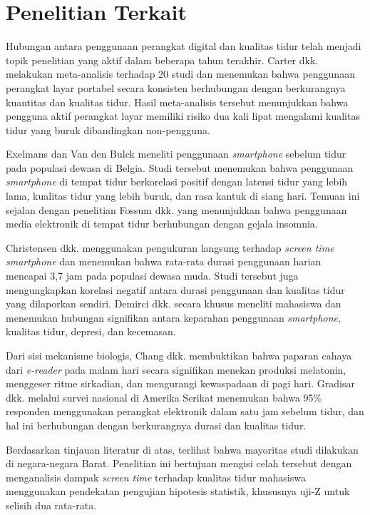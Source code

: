 \documentclass[metlit,article,accept,pdftex,moreauthors]{Definitions/mdpi}
\begin{document}
\section{Penelitian Terkait}

Hubungan antara penggunaan perangkat digital dan kualitas tidur telah menjadi topik penelitian yang aktif dalam beberapa tahun terakhir. Carter dkk. \cite{carter2016association} melakukan meta-analisis terhadap 20 studi dan menemukan bahwa penggunaan perangkat layar portabel secara konsisten berhubungan dengan berkurangnya kuantitas dan kualitas tidur. Hasil meta-analisis tersebut menunjukkan bahwa pengguna aktif perangkat layar memiliki risiko dua kali lipat mengalami kualitas tidur yang buruk dibandingkan non-pengguna.

Exelmans dan Van den Bulck \cite{exelmans2016bedtime} meneliti penggunaan \textit{smartphone} sebelum tidur pada populasi dewasa di Belgia. Studi tersebut menemukan bahwa penggunaan \textit{smartphone} di tempat tidur berkorelasi positif dengan latensi tidur yang lebih lama, kualitas tidur yang lebih buruk, dan rasa kantuk di siang hari. Temuan ini sejalan dengan penelitian Fossum dkk. \cite{fossum2014association} yang menunjukkan bahwa penggunaan media elektronik di tempat tidur berhubungan dengan gejala insomnia.

Christensen dkk. \cite{christensen2016direct} menggunakan pengukuran langsung terhadap \textit{screen time smartphone} dan menemukan bahwa rata-rata durasi penggunaan harian mencapai 3,7 jam pada populasi dewasa muda. Studi tersebut juga mengungkapkan korelasi negatif antara durasi penggunaan dan kualitas tidur yang dilaporkan sendiri. Demirci dkk. \cite{demirci2015relationship} secara khusus meneliti mahasiswa dan menemukan hubungan signifikan antara keparahan penggunaan \textit{smartphone}, kualitas tidur, depresi, dan kecemasan.

Dari sisi mekanisme biologis, Chang dkk. \cite{chang2015evening} membuktikan bahwa paparan cahaya dari \textit{e-reader} pada malam hari secara signifikan menekan produksi melatonin, menggeser ritme sirkadian, dan mengurangi kewaspadaan di pagi hari. Gradisar dkk. \cite{gradisar2013sleep} melalui survei nasional di Amerika Serikat menemukan bahwa 95\% responden menggunakan perangkat elektronik dalam satu jam sebelum tidur, dan hal ini berhubungan dengan berkurangnya durasi dan kualitas tidur.

Berdasarkan tinjauan literatur di atas, terlihat bahwa mayoritas studi dilakukan di negara-negara Barat. Penelitian ini bertujuan mengisi celah tersebut dengan menganalisis dampak \textit{screen time} terhadap kualitas tidur mahasiswa menggunakan pendekatan pengujian hipotesis statistik, khususnya uji-Z untuk selisih dua rata-rata.
\end{document}
